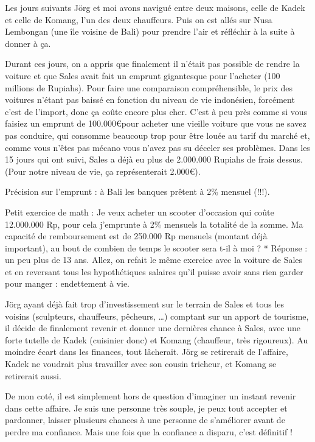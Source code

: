 Les jours suivants Jörg et moi avons navigué entre deux maisons, celle de Kadek et celle de Komang, l’un des deux chauffeurs. Puis on est allés sur Nusa Lembongan (une île voisine de Bali) pour prendre l’air et réfléchir à la suite à donner à ça.

Durant ces jours, on a appris que finalement il n’était pas possible de rendre la voiture et que Sales avait fait un emprunt gigantesque pour l’acheter (100 millions de Rupiahs). Pour faire une comparaison compréhensible, le prix des voitures n’étant pas baissé en fonction du niveau de vie indonésien, forcément c’est de l’import, donc ça coûte encore plus cher. C’est à peu près comme si vous faisiez un emprunt de 100.000\euro  pour acheter une vieille voiture que vous ne savez pas conduire, qui consomme beaucoup trop pour être louée au tarif du marché et, comme vous n’êtes pas mécano vous n’avez pas su déceler ses problèmes. Dans les 15 jours qui ont suivi, Sales a déjà eu plus de 2.000.000 Rupiahs de frais dessus. (Pour notre niveau de vie, ça représenterait 2.000\euro ).

Précision sur l’emprunt : à Bali les banques prêtent à 2\% mensuel (!!!).

Petit exercice de math : Je veux acheter un scooter d’occasion qui coûte 12.000.000 Rp, pour cela j’emprunte à 2\% mensuels la totalité de la somme. Ma capacité de remboursement est de 250.000 Rp mensuels (montant déjà important), au bout de combien de temps le scooter sera t-il à moi ? * Réponse : un peu plus de 13 ans. Allez, on refait le même exercice avec la voiture de Sales et en reversant tous les hypothétiques salaires qu’il puisse avoir sans rien garder pour manger : endettement à vie.

Jörg ayant déjà fait trop d’investissement sur le terrain de Sales et tous les voisins (sculpteurs, chauffeurs, pêcheurs, …) comptant sur un apport de tourisme, il décide de finalement revenir et donner une dernières chance à Sales, avec une forte tutelle de Kadek (cuisinier donc) et Komang (chauffeur, très rigoureux). Au moindre écart dans les finances, tout lâcherait. Jörg se retirerait de l’affaire, Kadek ne voudrait plus travailler avec son cousin tricheur, et Komang se retirerait aussi.

De mon coté, il est simplement hors de question d’imaginer un instant revenir dans cette affaire. Je suis une personne très souple, je peux tout accepter et pardonner, laisser plusieurs chances à une personne de s’améliorer avant de perdre ma confiance. Mais une fois que la confiance a disparu, c’est définitif !

